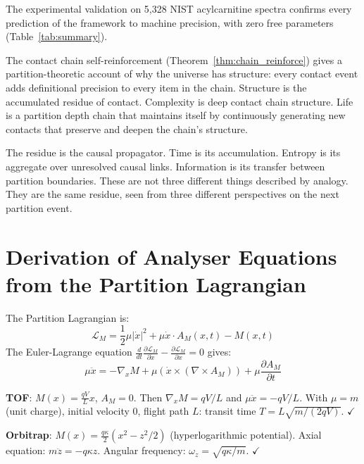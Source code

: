 \documentclass[11pt,twocolumn,a4paper]{article}
\theoremstyle{plain}
\theoremstyle{definition}
\theoremstyle{remark}
\begin{document}
The experimental validation on 5,328 NIST acylcarnitine spectra confirms every
prediction of the framework to machine precision, with zero free parameters
(Table~\ref{tab:summary}).

The contact chain self-reinforcement (Theorem~\ref{thm:chain_reinforce}) gives a
partition-theoretic account of why the universe has structure: every contact
event adds definitional precision to every item in the chain. Structure is the
accumulated residue of contact. Complexity is deep contact chain structure.
Life is a partition depth chain that maintains itself by continuously generating
new contacts that preserve and deepen the chain's structure.

The residue is the causal propagator. Time is its accumulation. Entropy is its
aggregate over unresolved causal links. Information is its transfer between
partition boundaries. These are not three different things described by analogy.
They are the same residue, seen from three different perspectives on the next
partition event.


\appendix

\section{Derivation of Analyser Equations from the Partition Lagrangian}
\label{app:analyser_derivations}

The Partition Lagrangian is:
\begin{equation}
    \mathcal{L}_M = \frac{1}{2}\mu|\dot{x}|^2 + \mu\dot{x} \cdot A_M(x,t)
    - M(x,t)
    \tag{A.1}
\end{equation}
The Euler-Lagrange equation $\frac{d}{dt}\frac{\partial\mathcal{L}_M}{\partial\dot{x}}
- \frac{\partial\mathcal{L}_M}{\partial x} = 0$ gives:
\begin{equation}
    \mu\ddot{x} = -\nabla_x M + \mu(\dot{x} \times (\nabla \times A_M))
    + \mu\frac{\partial A_M}{\partial t}
    \tag{A.2}
\end{equation}

\textbf{TOF}: $M(x) = \frac{qV}{L}x$, $A_M = 0$. Then $\nabla_x M = qV/L$
and $\mu\ddot{x} = -qV/L$. With $\mu = m$ (unit charge), initial velocity 0,
flight path $L$: transit time $T = L\sqrt{m/(2qV)}$. $\checkmark$

\textbf{Orbitrap}: $M(x) = \frac{q\kappa}{2}(x^2 - z^2/2)$ (hyperlogarithmic
potential). Axial equation: $m\ddot{z} = -q\kappa z$. Angular frequency:
$\omega_z = \sqrt{q\kappa/m}$. $\checkmark$
\end{document}
